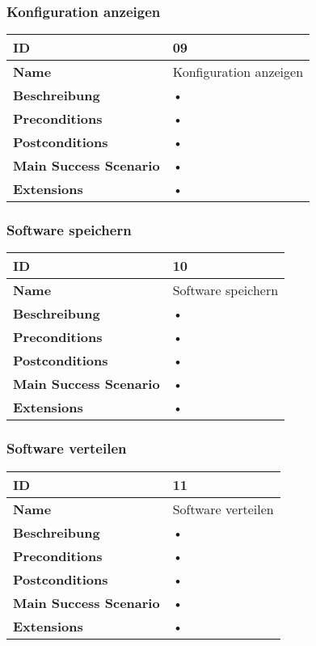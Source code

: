 \subsubsection{Konfiguration anzeigen}
\mbox{}
\begin{longtable}{| p{4cm} | p{11.7cm} |}
 \hline
 \textbf{ID} & 09\\ \hline 
 \textbf{Name} & Konfiguration anzeigen\\ \hline 
 \textbf{Beschreibung} & • \\ \hline 
 \textbf{Preconditions} & • \\ \hline 
 \textbf{Postconditions} & • \\ \hline 
 \textbf{Main Success Scenario} & • \\ \hline 
 \textbf{Extensions} & • \\ \hline 
 \end{longtable}
 
\subsubsection{Software speichern}
\mbox{}
\begin{longtable}{| p{4cm} | p{11.7cm} |}
 \hline
 \textbf{ID} & 10\\ \hline 
 \textbf{Name} & Software speichern\\ \hline 
 \textbf{Beschreibung} & • \\ \hline 
 \textbf{Preconditions} & • \\ \hline 
 \textbf{Postconditions} & • \\ \hline 
 \textbf{Main Success Scenario} & • \\ \hline 
 \textbf{Extensions} & • \\ \hline 
 \end{longtable}
 
\subsubsection{Software verteilen}
\mbox{}
\begin{longtable}{| p{4cm} | p{11.7cm} |}
 \hline
 \textbf{ID} & 11\\ \hline 
 \textbf{Name} & Software verteilen\\ \hline 
 \textbf{Beschreibung} & • \\ \hline 
 \textbf{Preconditions} & • \\ \hline 
 \textbf{Postconditions} & • \\ \hline 
 \textbf{Main Success Scenario} & • \\ \hline 
 \textbf{Extensions} & • \\ \hline 
 \end{longtable}
 
